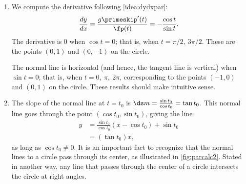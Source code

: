 {\begin{enumerate}
	\item We compute the derivative following \autoref{idea:dydxpar}:
	$$\frac{dy}{dx} = \frac{g\primeskip'(t)}{\fp(t)} = -\frac{\cos t}{\sin t}.$$
	The derivative is $0$ when $\cos t= 0$; that is, when $t=\pi/2,\ 3\pi/2$. These are the points $(0,1)$ and $(0,-1)$ on the circle.

	The normal line is horizontal (and hence, the tangent line is vertical) when $\sin t=0$; that is, when $t= 0,\ \pi,\ 2\pi$, corresponding to the points $(-1,0)$ and $(0,1)$ on the circle. These results should make intuitive sense.
	\item	The slope of the normal line at $t=t_0$ is $\ds m=\frac{\sin t_0}{\cos t_0} = \tan t_0$. This normal line goes through the point $(\cos t_0,\sin t_0)$, giving the line
\begin{align*}
	y &=\frac{\sin t_0}{\cos t_0}(x-\cos t_0) + \sin t_0\\	
	&= (\tan t_0)x,
\end{align*}%
%
as long as $\cos t_0\neq 0$. It is an important fact to recognize that the normal lines to a circle pass through its center, as illustrated in \autoref{fig:parcalc2}. Stated in another way, any line that passes through the center of a circle intersects the circle at right angles.\eoehere
\end{enumerate}}

